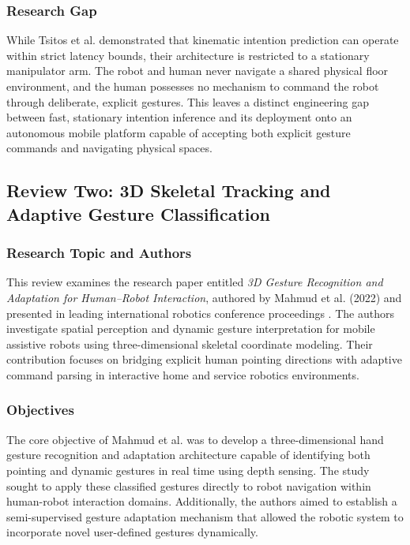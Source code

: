 \subsubsection{Research Gap}
While Tsitos et al. demonstrated that kinematic intention prediction can operate within strict latency bounds, their architecture is restricted to a stationary manipulator arm. The robot and human never navigate a shared physical floor environment, and the human possesses no mechanism to command the robot through deliberate, explicit gestures. This leaves a distinct engineering gap between fast, stationary intention inference and its deployment onto an autonomous mobile platform capable of accepting both explicit gesture commands and navigating physical spaces.

\subsection{Review Two: 3D Skeletal Tracking and Adaptive Gesture Classification}

\subsubsection{Research Topic and Authors}
This review examines the research paper entitled \textit{3D Gesture Recognition and Adaptation for Human--Robot Interaction}, authored by Mahmud et al. (2022) and presented in leading international robotics conference proceedings \cite{mahmud2022}. The authors investigate spatial perception and dynamic gesture interpretation for mobile assistive robots using three-dimensional skeletal coordinate modeling. Their contribution focuses on bridging explicit human pointing directions with adaptive command parsing in interactive home and service robotics environments.

\subsubsection{Objectives}
The core objective of Mahmud et al. was to develop a three-dimensional hand gesture recognition and adaptation architecture capable of identifying both pointing and dynamic gestures in real time using depth sensing. The study sought to apply these classified gestures directly to robot navigation within human-robot interaction domains. Additionally, the authors aimed to establish a semi-supervised gesture adaptation mechanism that allowed the robotic system to incorporate novel user-defined gestures dynamically.

